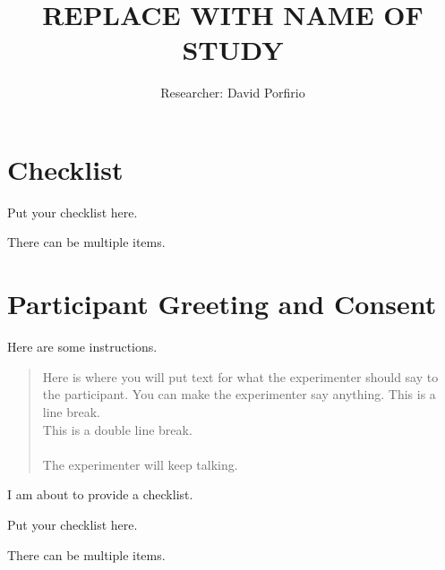 \documentclass{article}
\newenvironment{speak}
{\begin{center}
    \begin{addmargin}[1em]{0em}
    \begin{siderules}
    \begingroup\color{gray}
    \begin{quote}\openautoquote\hspace*{-1.3ex}
    }
    { 
    \hspace*{-1.3ex}\closeautoquote
    \end{quote}
    \endgroup
    \end{siderules}
    \end{addmargin} 
    \end{center}
    }
\newenvironment{instruction}
{
  \begin{addmargin}[0.6em]{0em}\noindent
}{
  \end{addmargin}
}
\newenvironment{enumerate*}%
  {\vspace{8pt}\begin{addmargin}[2pt]{0em}\begin{enumerate}%
    \setlength{\itemsep}{0pt}%
    \setlength{\parskip}{2pt}}%
  {\end{enumerate}\end{addmargin}}
\newenvironment{enumerate*}%
  {\vspace{8pt}\begin{addmargin}[2pt]{0em}\begin{enumerate}%
    \setlength{\itemsep}{0pt}%
    \setlength{\parskip}{2pt}}%
  {\end{enumerate}\end{addmargin}}
\begin{document}
\title{REPLACE WITH NAME OF STUDY}
\author{Researcher: David Porfirio}

\maketitle

\section*{Checklist}

\begin{enumerate*}
  \item Put your checklist here.
  \item There can be multiple items.
\end{enumerate*}

\section*{Participant Greeting and Consent}

\begin{instruction}
  Here are some instructions.
\end{instruction}

\begin{speak}
  Here is where you will put text for what the experimenter should say to the participant.
  You can make the experimenter say anything. 
  This is a line break.\\
  This is a double line break.\\\\
  The experimenter will keep talking.
\end{speak}

\begin{instruction}
  I am about to provide a checklist.
\end{instruction}

\begin{enumerate*}
  \item Put your checklist here.
  \item There can be multiple items.
\end{enumerate*}
\end{document}
